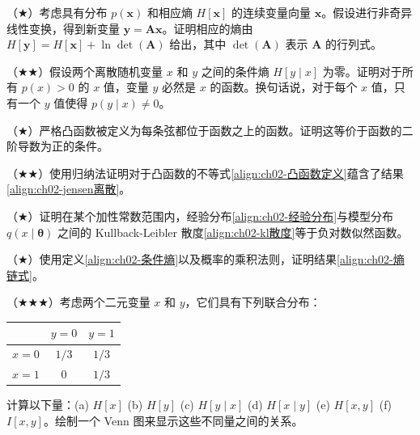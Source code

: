 \documentclass[../../main.tex]{subfiles}
\begin{document}
\begin{exercise}\label{exercise:ch02-30}
（$\bigstar$）考虑具有分布 $p(\mathbf{x})$ 和相应熵 $H[\mathbf{x}]$ 的连续变量向量 $\mathbf{x}$。假设进行非奇异线性变换，得到新变量 $\mathbf{y}=\mathbf{A}\mathbf{x}$。证明相应的熵由 $H[\mathbf{y}]=H[\mathbf{x}]+\ln\det(\mathbf{A})$ 给出，其中 $\det(\mathbf{A})$ 表示 $\mathbf{A}$ 的行列式。
\end{exercise}

\begin{exercise}\label{exercise:ch02-31}
（$\bigstar\bigstar$）假设两个离散随机变量 $x$ 和 $y$ 之间的条件熵 $H[y\mid x]$ 为零。证明对于所有 $p(x)>0$ 的 $x$ 值，变量 $y$ 必然是 $x$ 的函数。换句话说，对于每个 $x$ 值，只有一个 $y$ 值使得 $p(y\mid x)\neq0$。
\end{exercise}

\begin{exercise}\label{exercise:ch02-32}
（$\bigstar$）严格凸函数被定义为每条弦都位于函数之上的函数。证明这等价于函数的二阶导数为正的条件。
\end{exercise}

\begin{exercise}\label{exercise:ch02-33}
（$\bigstar\bigstar$）使用归纳法证明对于凸函数的不等式\eqref{align:ch02-凸函数定义}蕴含了结果\eqref{align:ch02-jensen离散}。
\end{exercise}

\begin{exercise}\label{exercise:ch02-34}
（$\bigstar$）证明在某个加性常数范围内，经验分布\eqref{align:ch02-经验分布}与模型分布 $q(x\mid\boldsymbol{\theta})$ 之间的 Kullback-Leibler 散度\eqref{align:ch02-kl散度}等于负对数似然函数。
\end{exercise}

\begin{exercise}\label{exercise:ch02-35}
（$\bigstar$）使用定义\eqref{align:ch02-条件熵}以及概率的乘积法则，证明结果\eqref{align:ch02-熵链式}。
\end{exercise}

\begin{exercise}\label{exercise:ch02-36}
（$\bigstar\bigstar\bigstar$）考虑两个二元变量 $x$ 和 $y$，它们具有下列联合分布：
\begin{center}
\begin{tabular}{c|cc}
  & $y=0$ & $y=1$ \\ \hline
  $x=0$ & $1/3$ & $1/3$ \\
  $x=1$ & $0$ & $1/3$
\end{tabular}
\end{center}
计算以下量：(a) $H[x]$ \quad (b) $H[y]$ \quad (c) $H[y\mid x]$ \quad (d) $H[x\mid y]$ \quad (e) $H[x,y]$ \quad (f) $I[x,y]$。绘制一个 Venn 图来显示这些不同量之间的关系。
\end{exercise}
\end{document}

